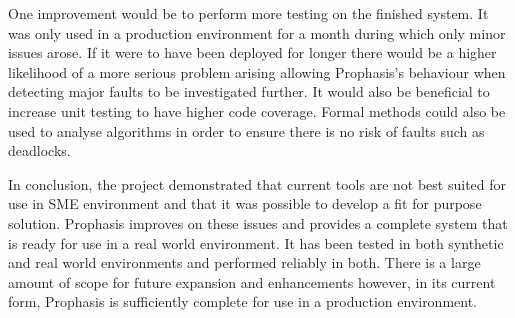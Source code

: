 \documentclass[bsc,deptreport,twoside,parskip,singlespacing,notimes]{infthesis}
\begin{document}
	One improvement would be to perform more testing on the finished system. It
	was only used in a production environment for a month during which only minor
	issues arose.  If it were to have been deployed for longer there would be a
	higher likelihood of a more serious problem arising allowing Prophasis's
	behaviour when detecting major faults to be investigated further. It would
	also be beneficial to increase unit testing to have higher code coverage.
	Formal methods could also be used to analyse algorithms in order to ensure
	there is no risk of faults such as deadlocks.


	In conclusion, the project demonstrated that current tools are not best suited
	for use in SME environment and that it was possible to develop a fit for purpose
	solution. Prophasis improves on these issues and provides a complete system that
	is ready for use in a real world environment.  It has been tested in both
	synthetic and real world environments and performed reliably in both.  There is
	a large amount of scope for future expansion and enhancements however, in its
	current form, Prophasis is sufficiently complete for use in a production
	environment.
	

\end{document}
